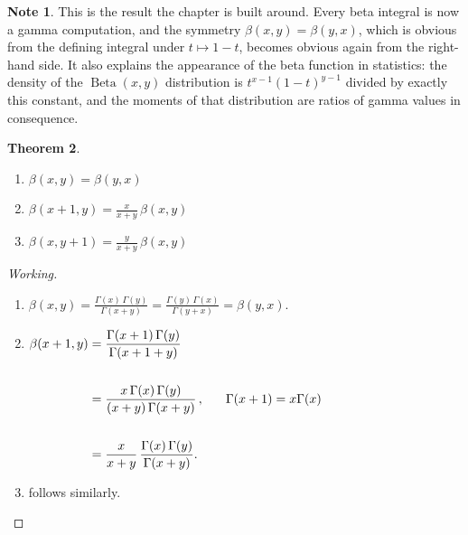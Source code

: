 \documentclass[12pt,a4paper]{report}
\theoremstyle{definition}
\newtheorem{thm}{Theorem}[section]
\newtheorem{note}[thm]{Note}
\theoremstyle{plain}
\begin{document}
\begin{note}
This is the result the chapter is built around. Every beta integral is now a
gamma computation, and the symmetry $\beta(x,y)=\beta(y,x)$, which is obvious
from the defining integral under $t\mapsto 1-t$, becomes obvious again from the
right-hand side. It also explains the appearance of the beta function in
statistics: the density of the $\operatorname{Beta}(x,y)$ distribution is
$t^{x-1}(1-t)^{y-1}$ divided by exactly this constant, and the moments of that
distribution are ratios of gamma values in consequence.
\end{note}






\begin{thm}\textbf{}
\vspace{-5mm}
\begin{enumerate}
\item[(a).] $\beta(x,y) = \beta(y,x)$

\item[(b).] $\beta(x+1,y) = \frac{x}{x+y}\, \beta(x,y)$

\item[(c).] $\beta(x, y+1) = \frac{y}{x + y}\, \beta(x,y)$
\end{enumerate}
\end{thm}


\begin{proof}[Working]\textbf{}
\vspace{-5mm}
\begin{enumerate}
\item[(a).] $\displaystyle{\beta(x,y) = \frac{\Gamma(x)\, \Gamma(y)}{\Gamma(x+y)}= \frac{\Gamma(y)\, \Gamma(x)}{\Gamma(y + x)} = \beta(y,x).}$


\item[(b).] $\begin{aligned}[t]
             \beta(x+1, y) & = \frac{\Gamma(x + 1)\, \Gamma(y)}{\Gamma(x + 1 + y)}\\\\
                           & = \frac{x\, \Gamma(x) \, \Gamma(y)}{(x + y)\, \Gamma(x + y)}\, , \hspace{0.6cm} \Gamma(x + 1 ) = x\Gamma(x)\\\\
                           & = \frac{x}{x + y}\, \frac{\Gamma(x)\, \Gamma(y)}{\Gamma(x + y)}.
             \end{aligned}$
\item[(c).] follows similarly.
\end{enumerate}
\end{proof}
\end{document}
